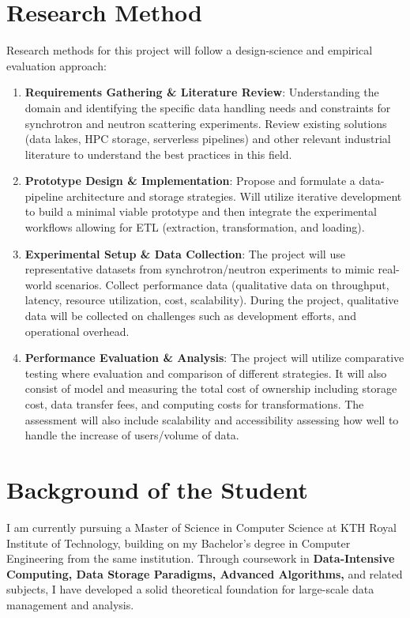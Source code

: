 \documentclass{article}
\begin{document}
\section{Research Method}
Research methods for this project will follow a design-science and empirical evaluation approach:

\begin{enumerate}
    \item \textbf{Requirements Gathering \& Literature Review}: Understanding the domain and identifying the specific data handling needs and constraints for synchrotron and neutron scattering experiments. Review existing solutions (data lakes, HPC storage, serverless pipelines) and other relevant industrial literature to understand the best practices in this field.
    \item \textbf{Prototype Design \& Implementation}: Propose and formulate a data-pipeline architecture and storage strategies. Will utilize iterative development to build a minimal viable prototype and then integrate the experimental workflows allowing for ETL (extraction, transformation, and loading).
    \item \textbf{Experimental Setup \& Data Collection}: The project will use representative datasets from synchrotron/neutron experiments to mimic real-world scenarios. Collect performance data (qualitative data on throughput, latency, resource utilization, cost, scalability). During the project, qualitative data will be collected on challenges such as development efforts, and operational overhead.
    \item \textbf{Performance Evaluation \& Analysis}: The project will utilize comparative testing where evaluation and comparison of different strategies. It will also consist of model and measuring the total cost of ownership including storage cost, data transfer fees, and computing costs for transformations. The assessment will also include scalability and accessibility assessing how well to handle the increase of users/volume of data.
\end{enumerate}

\section{Background of the Student}
I am currently pursuing a Master of Science in Computer Science at KTH Royal Institute of Technology, building on my Bachelor’s degree in Computer Engineering from the same institution. Through coursework in \textbf{Data-Intensive Computing, Data Storage Paradigms, Advanced Algorithms,} and related subjects, I have developed a solid theoretical foundation for large-scale data management and analysis. \\
\end{document}
